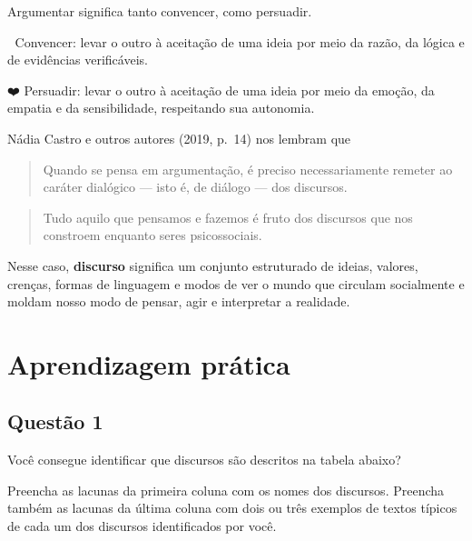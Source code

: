 \documentclass[
]{book}
\begin{document}
Argumentar significa tanto convencer, como persuadir.

🧠 Convencer: levar o outro à aceitação de uma ideia por meio da razão, da lógica e de evidências verificáveis.

❤️ Persuadir: levar o outro à aceitação de uma ideia por meio da emoção, da empatia e da sensibilidade, respeitando sua autonomia.

Nádia Castro e outros autores (2019, p.~14) nos lembram que

\begin{quote}
Quando se pensa em argumentação, é preciso necessariamente remeter ao caráter dialógico --- isto é, de diálogo --- dos discursos.
\end{quote}

\begin{quote}
Tudo aquilo que pensamos e fazemos é fruto dos discursos que nos constroem enquanto seres psicossociais.
\end{quote}

Nesse caso, \textbf{discurso} significa um conjunto estruturado de ideias, valores, crenças, formas de linguagem e modos de ver o mundo que circulam socialmente e moldam nosso modo de pensar, agir e interpretar a realidade.

\section{Aprendizagem prática}\label{aprendizagem-pruxe1tica-3}

\subsection{Questão 1}\label{questuxe3o-1-3}

Você consegue identificar que discursos são descritos na tabela abaixo?

Preencha as lacunas da primeira coluna com os nomes dos discursos. Preencha também as lacunas da última coluna com dois ou três exemplos de textos típicos de cada um dos discursos identificados por você.
\end{document}
